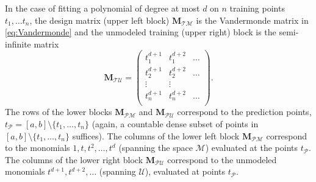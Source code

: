 \documentclass[twocolumn,aps,prx,superscriptaddress,10pt]{revtex4-2}
\newcommand{\0}{\bm{0}}
\newcommand{\M}{\mathcal{M}} %
\newcommand{\V}{\mathcal{P}} %
\newcommand{\T}{\mathcal{T}} %
\newcommand{\U}{\mathcal{U}} %
\newcommand{\bbM}{\mathbf{M}}
\newcommand{\MTM}{\bbM_{\T\M}}
\newcommand{\MTU}{\bbM_{\T\U}}
\newcommand{\MVM}{\bbM_{\V\M}}
\newcommand{\MVU}{\bbM_{\V\U}}
\begin{document}
In the case of fitting a polynomial of degree at most $d$ on $n$ training points $t_1,\dots t_n$, the design matrix (upper left block) $\MTM$ is the Vandermonde matrix in \eqref{eq:Vandermonde}
and the unmodeled training (upper right) block is the semi-infinite matrix 
\[
\MTU = 
\begin{pmatrix}
t_1^{d+1} & t_1^{d+2} & \dots \\
t_2^{d+1} & t_2^{d+2} & \dots \\
  \vdots &  \vdots \\
t_n^{d+1} & t_n^{d+2} & \dots \\
\end{pmatrix}.
\]
The rows of the lower blocks $\MVM$ and $\MVU$ correspond to the prediction points,  $t_\V= [a,b]\setminus \{t_1,\dots, t_n\}$ (again, a countable dense subset of points in $[a,b]\setminus \{t_1,\dots, t_n\}$ suffices).  The columns of the lower left block $\MVM$ correspond to the monomials $1,t,t^2,\dots, t^d$ (spanning the space $\M$) evaluated at the points $t_\V$. 
The columns of the lower right block $\MVU$ correspond to the unmodeled monomials $t^{d+1}, t^{d+2}, \dots$ (spanning $\U$), evaluated at points $t_\V$. 
\end{document}
